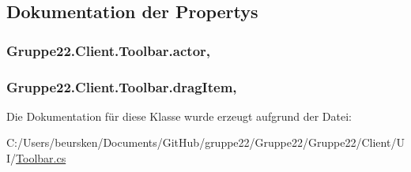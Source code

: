 \subsection{Dokumentation der Propertys}
\hypertarget{class_gruppe22_1_1_client_1_1_toolbar_a5a2570864b162027148e4b96159b938a}{
\subsubsection[{actor}]{ Gruppe22.\-Client.\-Toolbar.\-actor\hspace{0.3cm}{\ttfamily [get]}, {\ttfamily [set]}}}\label{class_gruppe22_1_1_client_1_1_toolbar_a5a2570864b162027148e4b96159b938a}
\hypertarget{class_gruppe22_1_1_client_1_1_toolbar_a3881a61e0503bcbb42c7a80a7fd67c32}{
\subsubsection[{drag\-Item}]{ Gruppe22.\-Client.\-Toolbar.\-drag\-Item\hspace{0.3cm}{\ttfamily [get]}, {\ttfamily [set]}}}\label{class_gruppe22_1_1_client_1_1_toolbar_a3881a61e0503bcbb42c7a80a7fd67c32}


Die Dokumentation für diese Klasse wurde erzeugt aufgrund der Datei\-:\begin{DoxyCompactItemize}
\item 
C\-:/\-Users/beursken/\-Documents/\-Git\-Hub/gruppe22/\-Gruppe22/\-Gruppe22/\-Client/\-U\-I/\hyperlink{_toolbar_8cs}{Toolbar.\-cs}\end{DoxyCompactItemize}
